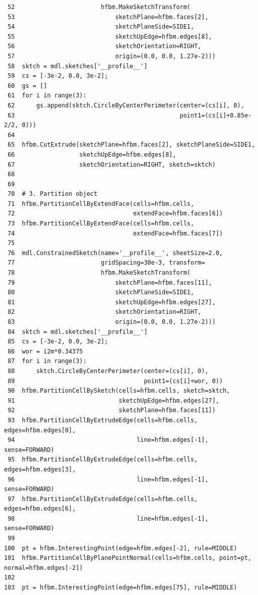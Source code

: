 \documentclass[11pt]{article}
\begin{document}
\begin{enumerate}
\begin{verbatim}
 52                        hfbm.MakeSketchTransform(
 53                            sketchPlane=hfbm.faces[2],
 54                            sketchPlaneSide=SIDE1,
 55                            sketchUpEdge=hfbm.edges[8],
 56                            sketchOrientation=RIGHT,
 57                            origin=(0.0, 0.0, 1.27e-2)))
 58  sktch = mdl.sketches['__profile__']
 59  cs = [-3e-2, 0.0, 3e-2];
 60  gs = []
 61  for i in range(3):
 62      gs.append(sktch.CircleByCenterPerimeter(center=(cs[i], 0),
 63                                              point1=(cs[i]+0.85e-2/2, 0)))
 64  
 65  hfbm.CutExtrude(sketchPlane=hfbm.faces[2], sketchPlaneSide=SIDE1,
 66                  sketchUpEdge=hfbm.edges[8],
 67                  sketchOrientation=RIGHT, sketch=sktch)
 68  
 69  
 70  # 3. Partition object
 71  hfbm.PartitionCellByExtendFace(cells=hfbm.cells,
 72                                 extendFace=hfbm.faces[6])
 73  hfbm.PartitionCellByExtendFace(cells=hfbm.cells,
 74                                 extendFace=hfbm.faces[7])
 75  
 76  mdl.ConstrainedSketch(name='__profile__', sheetSize=2.0,
 77                        gridSpacing=30e-3, transform=
 78                        hfbm.MakeSketchTransform(
 79                            sketchPlane=hfbm.faces[11],
 80                            sketchPlaneSide=SIDE1,
 81                            sketchUpEdge=hfbm.edges[27],
 82                            sketchOrientation=RIGHT,
 83                            origin=(0.0, 0.0, 1.27e-2)))
 84  sktch = mdl.sketches['__profile__']
 85  cs = [-3e-2, 0.0, 3e-2];
 86  wor = i2m*0.34375
 87  for i in range(3):
 88      sktch.CircleByCenterPerimeter(center=(cs[i], 0),
 89                                    point1=(cs[i]+wor, 0))
 90  hfbm.PartitionCellBySketch(cells=hfbm.cells, sketch=sktch,
 91                             sketchUpEdge=hfbm.edges[27],
 92                             sketchPlane=hfbm.faces[11])
 93  hfbm.PartitionCellByExtrudeEdge(cells=hfbm.cells, edges=hfbm.edges[0],
 94                                  line=hfbm.edges[-1], sense=FORWARD)
 95  hfbm.PartitionCellByExtrudeEdge(cells=hfbm.cells, edges=hfbm.edges[3],
 96                                  line=hfbm.edges[-1], sense=FORWARD)
 97  hfbm.PartitionCellByExtrudeEdge(cells=hfbm.cells, edges=hfbm.edges[6],
 98                                  line=hfbm.edges[-1], sense=FORWARD)
 99  
100  pt = hfbm.InterestingPoint(edge=hfbm.edges[-2], rule=MIDDLE)
101  hfbm.PartitionCellByPlanePointNormal(cells=hfbm.cells, point=pt, normal=hfbm.edges[-2])
102  
103  pt = hfbm.InterestingPoint(edge=hfbm.edges[75], rule=MIDDLE)

\end{verbatim}
\end{enumerate}
\end{document}
